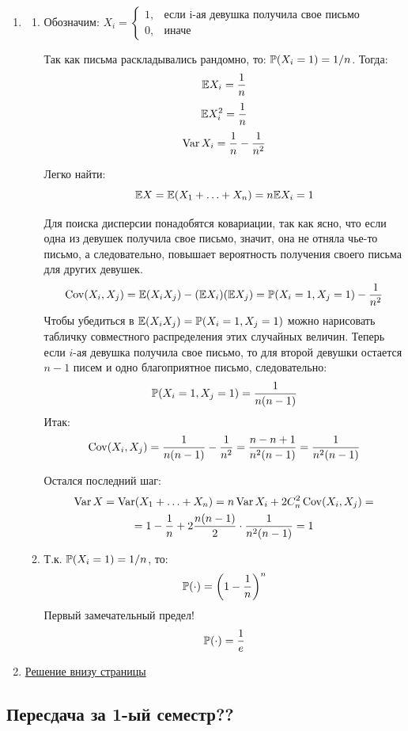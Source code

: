 \documentclass[12pt, a4paper]{article}\usepackage[]{graphicx}\usepackage[]{color}
\begin{document}
\begin{enumerate}
\item
\begin{enumerate}
\item Обозначим:
$X_i =
\begin{cases}
1, &\text{если i-ая девушка получила свое письмо} \\
0, &\text{иначе}
\end{cases}
$

Так как письма раскладывались рандомно, то: $\P (X_i = 1) = 1/n$. Тогда:
\[ \E X_i = \frac{1}{n} \]
\[ \E X_i^2 = \frac{1}{n} \]
\[ \Var X_i = \frac{1}{n} - \frac{1}{n^2} \]

Легко найти:
\[ \E X = \E (X_1 + \ldots + X_n) = n \E X_i = 1 \]

Для поиска дисперсии понадобятся ковариации, так как ясно, что если одна из девушек получила свое письмо, значит, она не отняла чье-то письмо, а следовательно, повышает вероятность получения своего письма для других девушек.
\[\Cov(X_i, X_j) = \E (X_i X_j) - (\E X_i)( \E X_j ) = \P (X_i = 1, X_j = 1) - \frac{1}{n^2}   \]
Чтобы убедиться в \(  \E (X_i X_j) = \P (X_i = 1, X_j = 1) \) можно нарисовать табличку совместного распределения этих случайных величин.
Теперь если $i$-ая девушка получила свое письмо, то для второй девушки остается $n-1$ писем и одно благоприятное письмо, следовательно:
\[\P (X_i = 1, X_j = 1) = \frac{1}{n(n-1)} \]
Итак:
\[\Cov(X_i, X_j) = \frac{1}{n(n-1)} - \frac{1}{n^2} =  \frac{n - n + 1}{n^2 (n-1)}  = \frac{ 1}{n^2 (n-1)} \]

Остался последний шаг:
\begin{multline*}
\Var X = \Var (X_1 + \ldots + X_n) = n \Var X_i + 2C_n^2 \Cov(X_i, X_j) = \\
=   1 - \frac{1}{n} + 2 \frac{n (n-1)}{2} \cdot \frac{ 1}{n^2 (n-1)} = 1
\end{multline*}
\item Т.к. $\P (X_i = 1) = 1/n$, то: \[ \P(\cdot) = \left(1 - \frac{1}{n} \right)^n   \]
Первый замечательный предел!
\[ \P(\cdot) = \frac{1}{e} \]
\end{enumerate}

\item
\href{http://www.nsu.ru/mmf/tvims/chernova/tv/lec/node6.html}{Решение внизу страницы}

\end{enumerate}

\subsection{Пересдача за 1-ый семестр??}
\end{document}
